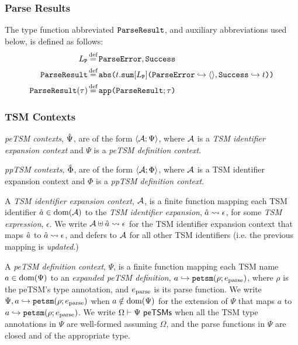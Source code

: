 \subsubsection{Parse Results}
 The type function abbreviated $\mathtt{ParseResult}$, and auxiliary abbreviations used below, is defined as follows:
\begin{align*}
L_\mathtt{P} & \defeq \lbltxt{ParseError}, \lbltxt{Success}\\
\tParseResultF & \defeq \acabs{t}{\asum{L_\mathtt{P}}{
  \mapitem{\lbltxt{ParseError}}{\prodt{}}, 
  \mapitem{\lbltxt{Success}}{t}
}}\\
\tParseResult{\tau} & \defeq \acapp{\tParseResultF}{\tau}\\
\end{align*} %

\subsubsection{TSM Contexts}
\emph{peTSM contexts}, $\hat{\Psi}$, are of the form $\langle \mathcal{A}; \Psi \rangle$, where $\mathcal{A}$ is a \emph{TSM identifier expansion context} and $\Psi$ is a \emph{peTSM definition context}.

\emph{ppTSM contexts}, $\hat\Phi$, are of the form $\langle \mathcal{A}; \Phi \rangle$, where $\mathcal{A}$ is a TSM identifier expansion context and $\Phi$ is a \emph{ppTSM definition context}.

A \emph{TSM identifier expansion context}, $\mathcal{A}$, is a finite function mapping each TSM identifier $\hat{a} \in \text{dom}(\mathcal{A})$ to the \emph{TSM identifier expansion}, $\hat{a} \leadsto \epsilon$, for some \emph{TSM expression}, $\epsilon$. We write $\mathcal{A} \uplus \hat{a} \leadsto \epsilon$ for the TSM identifier expansion context that maps $\hat{a}$ to $\hat{a} \leadsto \epsilon$, and defers to $\mathcal{A}$ for all other TSM identifiers (i.e. the previous mapping is \emph{updated}.)

A \emph{peTSM definition context}, $\Psi$, is a finite function mapping each TSM name $a \in \text{dom}(\Psi)$ to an \emph{expanded peTSM definition}, $a \hookrightarrow \texttt{petsm}(\rho; e_\text{parse})$, where $\rho$ is the peTSM's type annotation, and $e_\text{parse}$ is its parse function. We write $\Psi, a \hookrightarrow \texttt{petsm}(\rho; e_\text{parse})$ when $a \notin \text{dom}(\Psi)$ for the extension of $\Psi$ that maps $a$ to $a \hookrightarrow \texttt{petsm}(\rho; e_\text{parse})$. We write $\Omega \vdash \Psi~\mathsf{peTSMs}$  when all the TSM type annotations in $\Psi$ are well-formed assuming $\Omega$, and the parse functions in $\Psi$ are closed and of the appropriate type.


